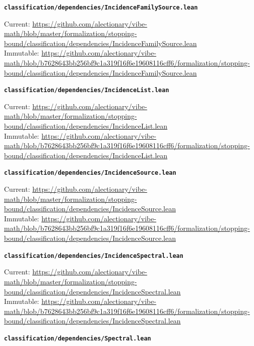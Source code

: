 \smallskip
\medskip
\par\noindent\textbf{\texttt{classification/dependencies/IncidenceFamilySource.lean}}\par\nopagebreak
{\footnotesize\noindent Current: \url{https://github.com/alectionary/vibe-math/blob/master/formalization/stopping-bound/classification/dependencies/IncidenceFamilySource.lean}\\
Immutable: \url{https://github.com/alectionary/vibe-math/blob/b7628643bb256bf9c1a319f16f6e19608116cff6/formalization/stopping-bound/classification/dependencies/IncidenceFamilySource.lean}\par}
\smallskip
\medskip
\par\noindent\textbf{\texttt{classification/dependencies/IncidenceList.lean}}\par\nopagebreak
{\footnotesize\noindent Current: \url{https://github.com/alectionary/vibe-math/blob/master/formalization/stopping-bound/classification/dependencies/IncidenceList.lean}\\
Immutable: \url{https://github.com/alectionary/vibe-math/blob/b7628643bb256bf9c1a319f16f6e19608116cff6/formalization/stopping-bound/classification/dependencies/IncidenceList.lean}\par}
\smallskip
\medskip
\par\noindent\textbf{\texttt{classification/dependencies/IncidenceSource.lean}}\par\nopagebreak
{\footnotesize\noindent Current: \url{https://github.com/alectionary/vibe-math/blob/master/formalization/stopping-bound/classification/dependencies/IncidenceSource.lean}\\
Immutable: \url{https://github.com/alectionary/vibe-math/blob/b7628643bb256bf9c1a319f16f6e19608116cff6/formalization/stopping-bound/classification/dependencies/IncidenceSource.lean}\par}
\smallskip
\medskip
\par\noindent\textbf{\texttt{classification/dependencies/IncidenceSpectral.lean}}\par\nopagebreak
{\footnotesize\noindent Current: \url{https://github.com/alectionary/vibe-math/blob/master/formalization/stopping-bound/classification/dependencies/IncidenceSpectral.lean}\\
Immutable: \url{https://github.com/alectionary/vibe-math/blob/b7628643bb256bf9c1a319f16f6e19608116cff6/formalization/stopping-bound/classification/dependencies/IncidenceSpectral.lean}\par}
\smallskip
\medskip
\par\noindent\textbf{\texttt{classification/dependencies/Spectral.lean}}\par\nopagebreak
